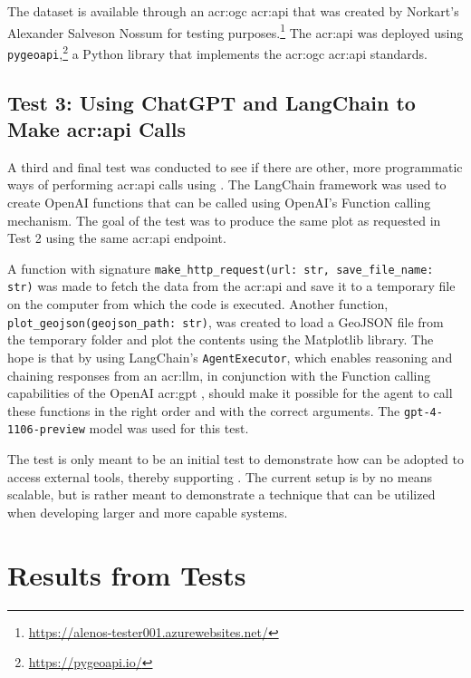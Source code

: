 The dataset is available through an \acrshort{acr:ogc} \acrshort{acr:api} that was created by Norkart's Alexander Salveson Nossum for testing purposes.\footnote{\url{https://alenos-tester001.azurewebsites.net/}} The \acrshort{acr:api} was deployed using \texttt{pygeoapi},\footnote{\url{https://pygeoapi.io/}} a Python library that implements the \acrshort{acr:ogc} \acrshort{acr:api} standards.

\subsection[Test 3: Using ChatGPT and LangChain to Make API Calls]{Test 3: Using ChatGPT and LangChain to Make \acrshort{acr:api} Calls}\label{subsec:ex-3-setup}

A third and final test was conducted to see if there are other, more programmatic ways of performing \acrshort{acr:api} calls using . The LangChain framework \citep{chaseLangChain2022} was used to create OpenAI functions that can be called using OpenAI's Function calling mechanism. The goal of the test was to produce the same plot as requested in Test 2 using the same \acrshort{acr:api} endpoint.

A function with signature \texttt{make\_http\_request(url: str, save\_file\_name: str)} was made to fetch the data from the \acrshort{acr:api} and save it to a temporary file on the computer from which the code is executed. Another function, \texttt{plot\_geojson(geojson\_path: str)}, was created to load a GeoJSON file from the temporary folder and plot the contents using the Matplotlib library. The hope is that by using LangChain's \texttt{AgentExecutor}, which enables reasoning and chaining responses from an \acrshort{acr:llm}, in conjunction with the Function calling capabilities of the OpenAI \acrshort{acr:gpt} , should make it possible for the agent to call these functions in the right order and with the correct arguments. The \texttt{gpt-4-1106-preview} model was used for this test.

The test is only meant to be an initial test to demonstrate how  can be adopted to access external tools, thereby supporting . The current setup is by no means scalable, but is rather meant to demonstrate a technique that can be utilized when developing larger and more capable systems.

\section{Results from Tests}\label{sec:experimental-results}

